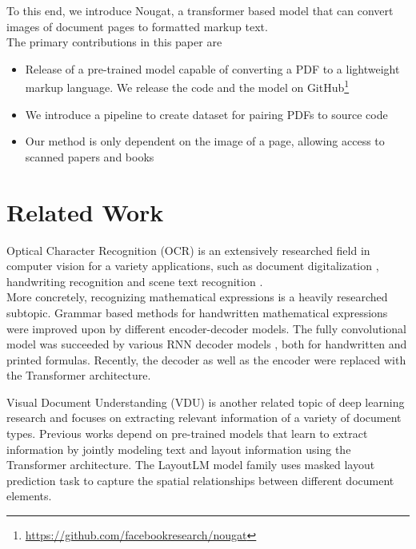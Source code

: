 \documentclass[]{article}
\newcommand{\footurl}[1]{\footnote{\url{#1}}}
\begin{document}
To this end, we introduce Nougat, a transformer based model that can convert images of document pages to formatted markup text.
\\The primary contributions in this paper are
\begin{itemize}
    \item Release of a pre-trained model capable of converting a PDF to a lightweight markup language. We release the code and the model on GitHub\footurl{https://github.com/facebookresearch/nougat}
    \item We introduce a pipeline to create dataset for pairing PDFs to source code 
    \item Our method is only dependent on the image of a page, allowing access to scanned papers and books
\end{itemize}

\section{Related Work}
Optical Character Recognition (OCR) is an extensively researched field in computer vision for a variety applications, such as document digitalization \cite{moysset_full-page_2017, smith_overview_2007}, handwriting recognition and scene text recognition \cite{bautista_scene_2022, li_trocr_2022, diaz_rethinking_2021}.
\\More concretely, recognizing mathematical expressions is a heavily researched subtopic. Grammar based methods \cite{maclean_new_2013, awal_global_2014, alvaro_recognition_2014} for handwritten mathematical expressions were improved upon by different encoder-decoder models. The fully convolutional model \cite{yan_convmath_2020} was succeeded by various RNN decoder models \cite{deng_image--markup_2016, le_training_2017,singh_teaching_2018,zhang_multi-scale_2018,wang_translating_2019}, both for handwritten and printed formulas. Recently, the decoder \cite{zhao_handwritten_2021,mahdavi_icdar_2019} as well as the encoder \cite{blecher_pix2tex_2023} were replaced with the Transformer \cite{vaswani_attention_2017} architecture.

Visual Document Understanding (VDU) is another related topic of deep learning research and focuses on extracting relevant information of a variety of document types. %
Previous works depend on pre-trained models that learn to extract information by jointly modeling text and layout information using the Transformer architecture. The LayoutLM model family \cite{xu_layoutlm_2020, xu_layoutlmv2_2022, huang_layoutlmv3_2022} uses masked layout prediction task to capture the spatial relationships between different document elements.
\end{document}
